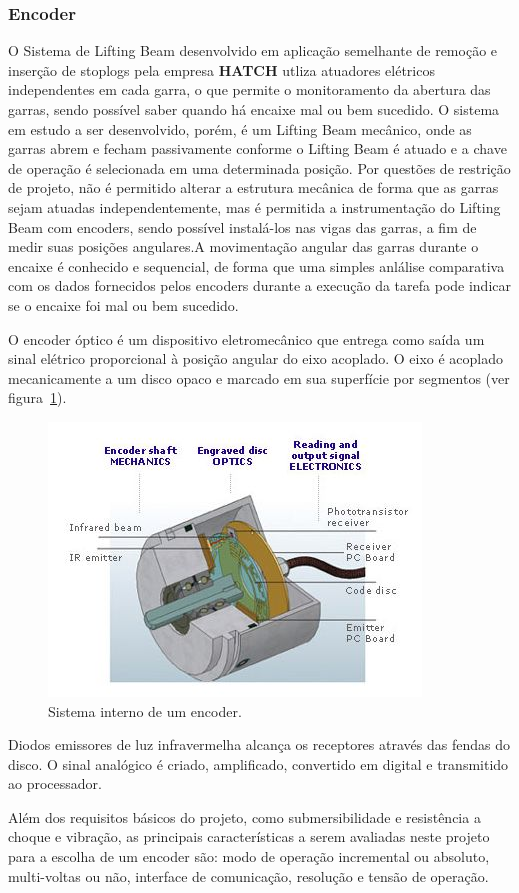 \subsubsection{Encoder}
O Sistema de Lifting Beam desenvolvido em aplicação semelhante de remoção e inserção de stoplogs pela empresa \textbf{HATCH} utliza atuadores elétricos independentes em cada garra, o que permite o monitoramento da abertura das garras, sendo possível saber quando há encaixe mal ou bem sucedido. O sistema em estudo a ser desenvolvido, porém, é um Lifting Beam mecânico, onde as garras abrem e fecham passivamente conforme o Lifting Beam é atuado e a chave de operação é selecionada em uma determinada posição. Por questões de restrição de projeto, não é permitido alterar a estrutura mecânica de forma que as garras sejam atuadas independentemente, mas é permitida a instrumentação do Lifting Beam com encoders, sendo possível instalá-los nas vigas das garras, a fim de medir suas posições angulares.A movimentação angular das garras durante o encaixe é conhecido e sequencial, de forma que uma simples anlálise comparativa com os dados fornecidos pelos encoders durante a execução da tarefa pode indicar se o encaixe foi mal ou bem sucedido.

O encoder óptico é um dispositivo eletromecânico que entrega como saída um sinal elétrico proporcional à posição angular do eixo acoplado. O eixo é acoplado mecanicamente a um disco opaco e marcado em sua superfície por segmentos (ver figura~\ref{encoder_1}).

\begin{figure}[H]
    \centering
    \includegraphics[width=0.5\columnwidth]{figs/encoder/1.jpg}
    \caption{Sistema interno de um encoder.}
    \label{encoder_1}
\end{figure}

Diodos emissores de luz infravermelha alcança os receptores através das fendas do disco. O sinal analógico é criado, amplificado, convertido em digital e transmitido ao processador.

Além dos requisitos básicos do projeto, como submersibilidade e resistência a choque e vibração, as principais características a serem avaliadas neste projeto para a escolha de um encoder são: modo de operação incremental ou absoluto, multi-voltas ou não, interface de comunicação, resolução e tensão de operação.

